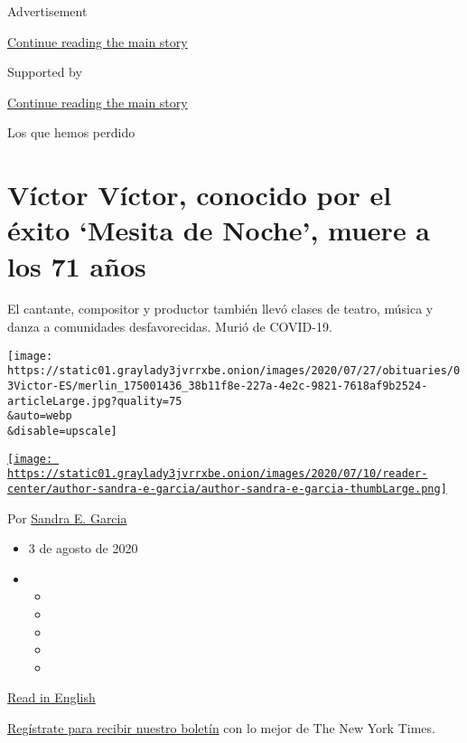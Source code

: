 Advertisement

\protect\hyperlink{after-top}{Continue reading the main story}

Supported by

\protect\hyperlink{after-sponsor}{Continue reading the main story}

Los que hemos perdido

\hypertarget{vuxedctor-vuxedctor-conocido-por-el-uxe9xito-mesita-de-noche-muere-a-los-71-auxf1os}{%
\section{Víctor Víctor, conocido por el éxito `Mesita de Noche', muere a
los 71
años}\label{vuxedctor-vuxedctor-conocido-por-el-uxe9xito-mesita-de-noche-muere-a-los-71-auxf1os}}

El cantante, compositor y productor también llevó clases de teatro,
música y danza a comunidades desfavorecidas. Murió de COVID-19.

\texttt{[image: https://static01.graylady3jvrrxbe.onion/images/2020/07/27/obituaries/03Victor-ES/merlin\_175001436\_38b11f8e-227a-4e2c-9821-7618af9b2524-articleLarge.jpg?quality=75\\\&auto=webp\\\&disable=upscale]}

\href{https://www.nytimes3xbfgragh.onion/by/sandra-e-garcia}{\texttt{[image: https://static01.graylady3jvrrxbe.onion/images/2020/07/10/reader-center/author-sandra-e-garcia/author-sandra-e-garcia-thumbLarge.png]}}

Por \href{https://www.nytimes3xbfgragh.onion/by/sandra-e-garcia}{Sandra
E. Garcia}

\begin{itemize}
\item
  3 de agosto de 2020
\item
  \begin{itemize}
  \item
  \item
  \item
  \item
  \item
  \end{itemize}
\end{itemize}

\href{https://www.nytimes3xbfgragh.onion/2020/08/01/obituaries/victor-victor-dead-coronavirus.html}{Read
in English}

\href{https://www.nytimes3xbfgragh.onion/newsletters/el-times}{Regístrate
para recibir nuestro boletín} con lo mejor de The New York Times.

